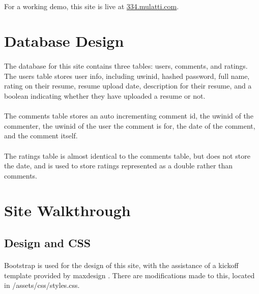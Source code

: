 \documentclass[11pt,letterpaper,titlepage]{article}
\begin{document}
        \paragraph{}
        For a working demo, this site is live at
        \href{334.mulatti.com}{334.mulatti.com}.


    \section{Database Design}
        \paragraph{}
        The database for this site contains three tables: users, comments, and
        ratings. The users table stores user info, including uwinid, hashed
        password, full name, rating on their resume, resume upload date,
        description for their resume, and a boolean indicating whether they have
        uploaded a resume or not.

        \paragraph{}
        The comments table stores an auto incrementing comment id, the uwinid of
        the commenter, the uwinid of the user the comment is for, the date of
        the comment, and the comment itself.

        \paragraph{}
        The ratings table is almost identical to the comments table, but does
        not store the date, and is used to store ratings represented as a double
        rather than comments.

    \section{Site Walkthrough}

        \subsection{Design and CSS}
        \paragraph{}
        Bootstrap is used for the design of this site, with the assistance
        of a kickoff template provided by maxdesign \cite{css}. There are
        modifications made to this, located in /assets/css/styles.css.
\end{document}
